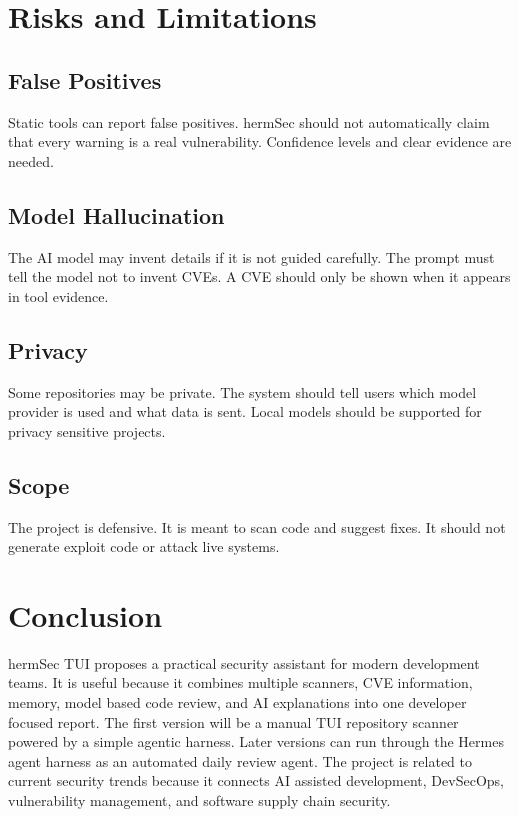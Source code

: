 \documentclass[
    numbers=noenddot,
    parskip=half-,
    fontsize=11pt,
    paper=a4,
    oneside,
    titlepage,
    bibliography=totoc,
    chapterprefix=false
]{scrbook}
\begin{document}
\chapter{Risks and Limitations}

\section{False Positives}

Static tools can report false positives. hermSec should not automatically claim that every warning is a real vulnerability. Confidence levels and clear evidence are needed.

\section{Model Hallucination}

The AI model may invent details if it is not guided carefully. The prompt must tell the model not to invent CVEs. A CVE should only be shown when it appears in tool evidence.

\section{Privacy}

Some repositories may be private. The system should tell users which model provider is used and what data is sent. Local models should be supported for privacy sensitive projects.

\section{Scope}

The project is defensive. It is meant to scan code and suggest fixes. It should not generate exploit code or attack live systems.

\chapter{Conclusion}

hermSec TUI proposes a practical security assistant for modern development teams. It is useful because it combines multiple scanners, CVE information, memory, model based code review, and AI explanations into one developer focused report. The first version will be a manual TUI repository scanner powered by a simple agentic harness. Later versions can run through the Hermes agent harness as an automated daily review agent. The project is related to current security trends because it connects AI assisted development, DevSecOps, vulnerability management, and software supply chain security.
\end{document}
